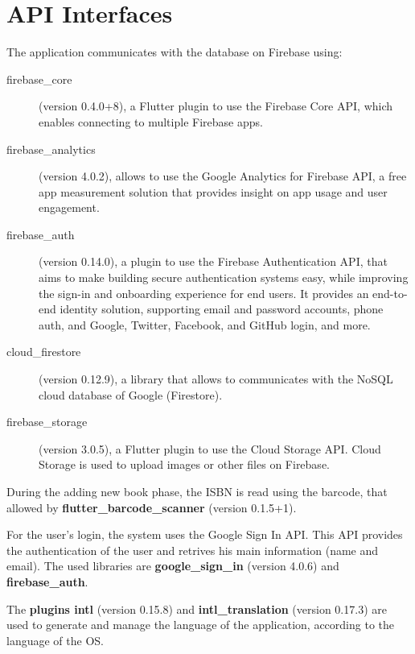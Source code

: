 \section{API Interfaces}
The application communicates with the database on Firebase using:
\begin{description}
    \item
    [firebase\_core] (version 0.4.0+8), a Flutter plugin to use the Firebase Core API, which enables connecting to multiple Firebase apps.
    \item
    [firebase\_analytics] (version 4.0.2), allows to use the Google Analytics for Firebase API, a free app measurement solution that provides insight on app usage and user engagement.
    \item
    [firebase\_auth] (version 0.14.0), a plugin to use the Firebase Authentication API, that aims to make building secure authentication systems easy, while improving the sign-in and onboarding experience for end users. It provides an end-to-end identity solution, supporting email and password accounts, phone auth, and Google, Twitter, Facebook, and GitHub login, and more.
    \item
    [cloud\_firestore] (version 0.12.9), a library that allows to communicates with the NoSQL cloud database of Google (Firestore).
    \item
    [firebase\_storage] (version 3.0.5), a Flutter plugin to use the Cloud Storage API. Cloud Storage is used to upload images or other files on Firebase.
\end{description}
During the adding new book phase, the ISBN is read using the barcode, that allowed by \textbf{flutter\_barcode\_scanner} (version 0.1.5+1).

For the user's login, the system uses the Google Sign In API. This API provides the authentication of the user and retrives his main information (name and email).
The used libraries are \textbf{google\_sign\_in} (version 4.0.6) and \textbf{firebase\_auth}.

The \textbf{plugins intl} (version 0.15.8) and \textbf{intl\_translation} (version 0.17.3) are used to generate and manage the language of the application, according to the language of the OS.